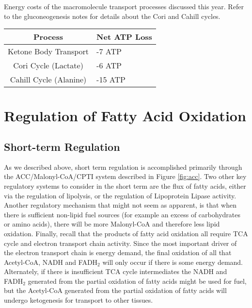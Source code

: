 \documentclass{tufte-handout}
\begin{document}
\begin{margintable}
\centering
\caption{Energy costs of the macromolecule transport processes discussed this year.  Refer to the gluconeogenesis notes for details about the Cori and Cahill cycles.}
\label{tab:transport-processes}
\begin{tabular}{@{}cl@{}}
\toprule
\textbf{Process} & \textbf{Net ATP Loss} \\ \midrule
Ketone Body Transport  &  -7 ATP  \\
Cori Cycle (Lactate)    & -6 ATP  \\
Cahill Cycle (Alanine)       & -15 ATP \\ \bottomrule
\end{tabular}
\end{margintable}

\section{Regulation of Fatty Acid Oxidation}

\subsection{Short-term Regulation}

As we described above, short term regulation is accomplished primarily through the ACC/Malonyl-CoA/CPTI system described in Figure \ref{fig:acc}.  Two other key regulatory systems to consider in the short term are the flux of fatty acids, either via the regulation of lipolysis, or the regulation of Lipoprotein Lipase activity.  Another regulatory mechanism that might not seem as apparent, is that when there is sufficient non-lipid fuel sources (for example an excess of carbohydrates or amino acids), there will be more Malonyl-CoA and therefore less lipid oxidation.  Finally, recall that the products of fatty acid oxidation all require TCA cycle and electron transport chain activity.  Since the most important driver of the electron transport chain is energy demand, the final oxidation of all that Acetyl-CoA, NADH and FADH$_2$ will only occur if there is some energy demand.   Alternately, if there is insufficient TCA cycle intermediates the NADH and FADH$_2$ generated from the partial oxidation of fatty acids might be used for fuel, but the Acetyl-CoA generated from the partial oxidation of fatty acids will undergo ketogenesis for transport to other tissues.
\end{document}
